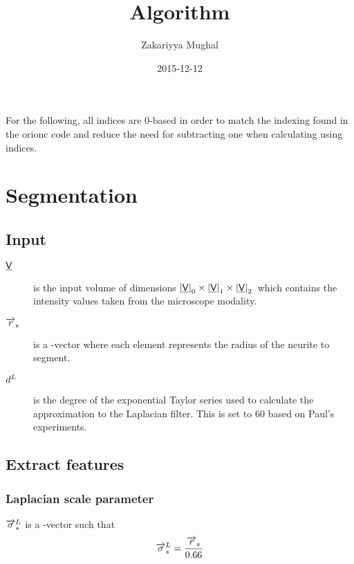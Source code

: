 \documentclass[12pt]{article}
\title{Algorithm}
\author{Zakariyya Mughal}
\date{2015-12-12}
\begin{document}
\maketitle
\tableofcontents

For the following, all indices are 0-based in order to match the
indexing found in the \gls{orionc} code and reduce the need for
subtracting one when calculating using indices.

\section{Segmentation}

\subsection{Input}

\begin{description}
	\item[\(\mathsf{\underline{V}}{}\)] is the input volume of dimensions
		\(\left|\mathsf{\underline{V}}\right|_0 \times \left|\mathsf{\underline{V}}\right|_1 \times \left|\mathsf{\underline{V}}\right|_2{}\) which contains the intensity values taken
		from the microscope modality.
	\item[\(\overrightarrow{r}_{s}{}\)] is a \Dim{\RadiiScalesName}-vector where each element
		represents the radius of the neurite to segment.
	\item[\(d^{L}{}\)] is the degree of the
		exponential Taylor series used to calculate the approximation
		to the Laplacian filter. This is set to \(\num{60}\) based on Paul's
		experiments.

\end{description}

\subsection{Extract features}

\subsubsection{Laplacian scale parameter}

\(\overrightarrow{\sigma}^{L}_{s}\) is a \Dim{\RadiiScalesName}-vector such that
\begin{dmath*}
\LaplacianScales = \frac{\RadiiScales{}}{\num{0.66}}
\end{dmath*}

\end{document}
